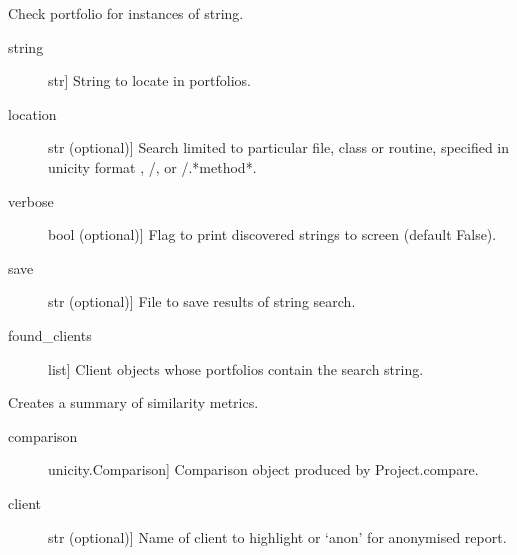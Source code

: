 \documentclass[letterpaper,10pt,english]{sphinxmanual}
\begin{document}
\begin{fulllineitems}

\begin{fulllineitems}
\label{\detokenize{index:unicity.Project.findstr}}
Check portfolio for instances of string.
\begin{description}
\item[{string}] \leavevmode{[}str{]}
String to locate in portfolios.

\item[{location}] \leavevmode{[}str (optional){]}
Search limited to particular file, class or routine, specified in unicity format
, /, or /.*method*.

\item[{verbose}] \leavevmode{[}bool (optional){]}
Flag to print discovered strings to screen (default False).

\item[{save}] \leavevmode{[}str (optional){]}
File to save results of string search.

\end{description}
\begin{description}
\item[{found\_clients}] \leavevmode{[}list{]}
Client objects whose portfolios contain the search string.

\end{description}

\end{fulllineitems}


\begin{fulllineitems}
\label{\detokenize{index:unicity.Project.similarity_report}}
Creates a summary of similarity metrics.
\begin{description}
\item[{comparison}] \leavevmode{[}unicity.Comparison{]}
Comparison object produced by Project.compare.

\item[{client}] \leavevmode{[}str (optional){]}
Name of client to highlight or ‘anon’ for anonymised report.


\end{description}
\end{fulllineitems}
\end{fulllineitems}
\end{document}
